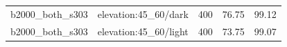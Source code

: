 \begin{longtable}{l>{\raggedright\arraybackslash}p{.42\linewidth}rrr}
b2000\_\allowbreak{}both\_\allowbreak{}s303 & %
elevation:45\_\allowbreak{}60/dark & %
400 & %
76.75 & %
99.12 \\ %

b2000\_\allowbreak{}both\_\allowbreak{}s303 & %
elevation:45\_\allowbreak{}60/light & %
400 & %
73.75 & %
99.07 \\ %


\end{longtable}
